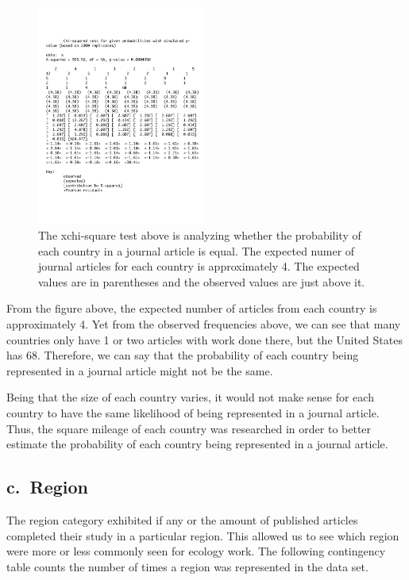 \documentclass[
]{article}
\begin{document}
\begin{figure}
    \centering
    \includegraphics[width=0.50\textwidth]{xchisq_country.pdf}
    \caption{The xchi-square test above is analyzing whether the probability of each country in a  journal article is equal. The expected numer of journal articles for each country is approximately 4. The expected values are in parentheses and the observed values are just above it.}
    \label{fig:Chi Square for Country}
\end{figure}

From the figure above, the expected number of articles from each country
is approximately 4. Yet from the observed frequencies above, we can see
that many countries only have 1 or two articles with work done there,
but the United States has 68. Therefore, we can say that the probability
of each country being represented in a journal article might not be the
same.

Being that the size of each country varies, it would not make sense for
each country to have the same likelihood of being represented in a
journal article. Thus, the square mileage of each country was researched
in order to better estimate the probability of each country being
represented in a journal article.

\hypertarget{c.-region}{%
\subsection{c.~Region}\label{c.-region}}

The region category exhibited if any or the amount of published articles
completed their study in a particular region. This allowed us to see
which region were more or less commonly seen for ecology work. The
following contingency table counts the number of times a region was
represented in the data set.
\end{document}
